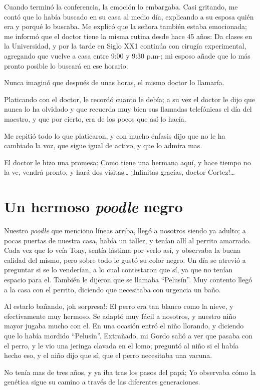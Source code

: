 \documentclass[letterpaper, 12pt]{book}
\begin{document}
Cuando terminó la conferencia, la emoción lo embargaba. Casi gritando, me contó que lo había buscado en su casa al medio día, explicando a su esposa quién era y porqué lo buscaba. Me explicó que la señora también estaba emocionada; me informó que el doctor tiene la misma rutina desde hace 45 años: Da clases en la Universidad, y por la tarde en Siglo XX1 continúa con cirugía experimental, agregando que vuelve a casa entre 9:00 y 9:30 p.m-; mi esposo añade que lo más pronto posible lo buscará en ese horario.

Nunca imaginó que después de unas horas, el mismo doctor lo llamaría.

Platicando con el doctor, le recordó cuanto le debía; a su vez el doctor le dijo que nunca lo ha olvidado y que recuerda muy bien sus llamadas telefónicas el día del maestro, y que por cierto, era de los pocos que así lo hacía.

Me repitió todo lo que platicaron, y con mucho énfasis dijo que no le ha cambiado la voz, que sigue igual de activo, y que lo admira mas.

El doctor le hizo una promesa: Como tiene una hermana aquí, y hace tiempo no la ve, vendrá pronto, y hará dos visitas\ldots
¡Infinitas gracias, doctor Cortez!\ldots
\chapter{Un hermoso {\it poodle} negro}
Nuestro {\it poodle} que menciono líneas arriba, llegó a nosotros siendo ya adulto; a pocas puertas de nuestra casa, había un taller, y tenían allí al perrito amarrado. Cada vez que lo veía Tony, sentía lástima por verlo así, y observaba la buena calidad del mismo, pero sobre todo le gustó su color negro. Un día se atrevió a preguntar si se lo venderían, a lo cual contestaron que sí, ya que no tenían espacio para el. También le dijeron que se llamaba ``Pelusín''. Muy contento llegó a la casa con el perrito, diciendo que necesitaba con urgencia un baño.

Al estarlo bañando, ¡oh sorpresa!: El perro era tan blanco como la nieve, y efectivamente muy hermoso. Se adaptó muy fácil a nosotros, y nuestro niño mayor  jugaba mucho con el. En una ocasión entró el niño llorando, y diciendo que lo había mordido ``Pelusín''. Extrañado, mi Gordo salió a ver que pasaba con el perro, y le vio una jeringa clavada en el lomo; preguntó al niño si el había hecho eso, y el niño dijo que sí, que el perro necesitaba una vacuna.

No tenía mas de tres años, y ya iba tras los pasos del papá; Yo observaba cómo la genética sigue su camino a través de las diferentes generaciones.
\end{document}
